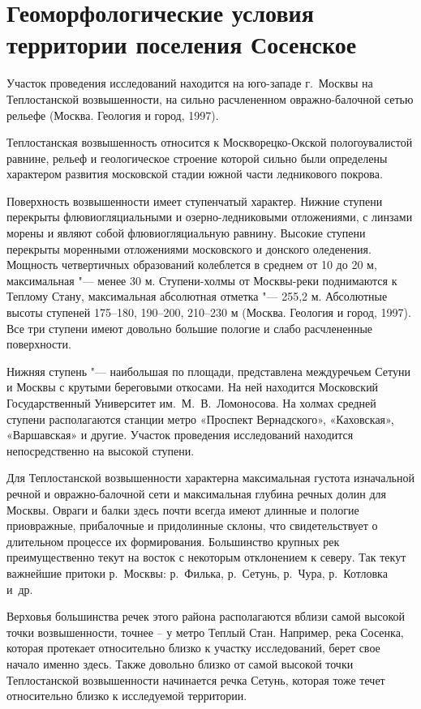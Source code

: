 \chapter{Геоморфологические условия территории поселения Сосенское}\label{ch:ch3}

Участок проведения исследований находится на юго-западе г.~Москвы на 
Теплостанской возвышенности, на сильно расчлененном овражно-балочной 
сетью рельефе (Москва. Геология и город, 1997). 

Теплостанская возвышенность относится к Москворецко-Окской пологоувалистой равнине, рельеф 
и геологическое строение которой сильно были определены характером развития московской 
стадии южной части ледникового покрова. 

Поверхность возвышенности имеет ступенчатый характер. Нижние ступени перекрыты флювиогляциальными 
и озерно-ледниковыми отложениями, с линзами морены и являют собой флювиогляциальную равнину. 
Высокие ступени перекрыты моренными отложениями московского и донского оледенения. 
Мощность четвертичных образований колеблется в среднем от 10 до 20 м, максимальная "--- менее 30 м. 
Ступени-холмы от Москвы-реки поднимаются к Теплому Стану, максимальная абсолютная отметка "--- 255,2 м. 
Абсолютные высоты ступеней 175--180, 190--200, 210--230 м (Москва. Геология и город, 1997). 
Все три ступени имеют довольно большие пологие 
и слабо расчлененные поверхности. 

Нижняя ступень "--- наибольшая по площади, представлена междуречьем Сетуни 
и Москвы с крутыми береговыми откосами. На ней находится 
Московский Государственный Университет им.~М.~В.~Ломоносова. 
На холмах средней ступени располагаются станции метро «Проспект Вернадского», 
«Каховская», «Варшавская» и другие. 
Участок проведения исследований находится непосредственно на высокой ступени. 

Для Теплостанской возвышенности характерна максимальная густота изначальной речной 
и овражно-балочной сети и максимальная глубина речных долин для Москвы. 
Овраги и балки здесь почти всегда имеют длинные и пологие приовражные, прибалочные и придолинные склоны, 
что свидетельствует о длительном процессе их формирования. Большинство крупных рек преимущественно текут 
на восток с некоторым отклонением к северу. Так текут важнейшие притоки р.~Москвы: 
р.~Филька, р.~Сетунь, р.~Чура, р.~Котловка и~др. 

Верховья большинства речек этого района располагаются вблизи самой высокой точки возвышенности, 
точнее – у метро Теплый Стан. Например, река Сосенка, которая протекает 
относительно близко к участку исследований, 
берет свое начало именно здесь. Также довольно близко от самой высокой точки 
Теплостанской возвышенности начинается речка Сетунь, которая тоже течет 
относительно близко к исследуемой территории.